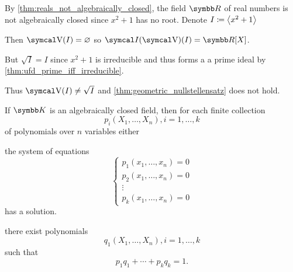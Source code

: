 \begin{example}\label{ex:geometric_nullstellensatz_does_not_hold_for_reals}
  By \cref{thm:reals_not_algebraically_closed}, the field \( \R \) of real numbers is not algebraically closed since \( x^2 + 1 \) has no root. Denote \( I \coloneqq \left\langle x^2 + 1 \right\rangle \)

  Then \( \V(I) = \varnothing \) so \( \Cal{I}(\V)(I) = \R[X] \).

  But \( \sqrt{I} = I \) since \( x^2 + 1 \) is irreducible and thus forms a a prime ideal by \cref{thm:ufd_prime_iff_irreducible}.

  Thus \( \V(I) \neq \sqrt{I} \) and \cref{thm:geometric_nullstellensatz} does not hold.
\end{example}

\begin{corollary}\label{thm:weak_nullstellensatz}\cite{Tao:nullstellensatz}
  If \( \K \) is an algebraically closed field, then for each finite collection
  \begin{equation*}
    p_i(X_1, \ldots, X_n), i = 1, \ldots, k
  \end{equation*}
  of polynomials over \( n \) variables either
  \begin{itemize}
     the system of equations
    \begin{equation}\label{thm:weak_nullstellensatz/system}
      \begin{cases}
        p_1(x_1, \ldots, x_n) = 0 \\
        p_2(x_1, \ldots, x_n) = 0 \\
        \vdots \\
        p_k(x_1, \ldots, x_n) = 0
      \end{cases}
    \end{equation}
    has a solution.

     there exist polynomials
    \begin{equation*}
      q_1(X_1, \ldots, X_n), i = 1, \ldots, k
    \end{equation*}
    such that
    \begin{equation*}
      p_1 q_1 + \cdots + p_k q_k = 1.
    \end{equation*}
  \end{itemize}
\end{corollary}
